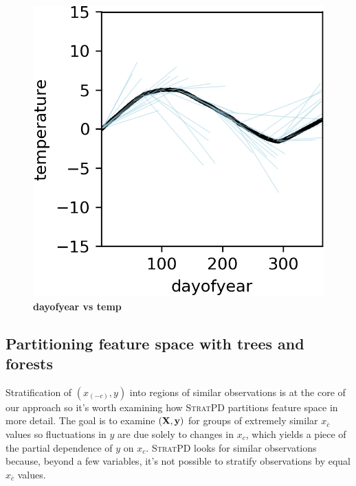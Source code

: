 \documentclass[12pt]{article}
\newcommand{\spd}{\fontfamily{cmr}\textsc{\small StratPD}}
\newcommand{\xnc}{$x_{\overline{c}}$}
\begin{document}
\begin{figure}[htbp]
\begin{center}
\includegraphics[scale=0.7]{images/dayofyear_vs_temp_stratpd.png}
\caption{{\bf  dayofyear  vs temp}}
\label{fig:dayofyear_vs_temp}
\end{center}
\end{figure}

\subsection{Partitioning feature space with trees and forests}

Stratification of $(x_{(-c)}, y)$ into regions of similar observations is at the core of our approach so it's worth examining how \spd{} partitions feature space in more detail.  The goal is to examine $({\bf X}, {\bf y})$ for groups of extremely similar \xnc{} values so fluctuations in $y$ are due solely to changes in $x_c$, which yields a piece of the partial dependence of $y$ on $x_c$. \spd{} looks for similar observations because, beyond a few variables, it's not possible to stratify observations by equal \xnc{} values. 
\end{document}
